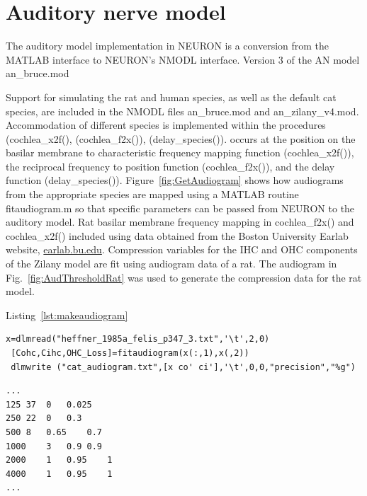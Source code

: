 \section{Auditory nerve model}

The auditory model implementation in NEURON is a conversion from the
MATLAB interface to NEURON's NMODL interface. Version 3 of the AN model \mbox{\textsf{an\_bruce.mod}}

Support for simulating the rat and human species, as well as the default cat species,  are included in the NMODL files
\mbox{\textsf{an\_bruce.mod}} and \mbox{\textsf{an\_zilany\_v4.mod}}.
Accommodation of different species is implemented within the procedures
(\mbox{\textsf{cochlea\_x2f()}}, (\mbox{\textsf{cochlea\_f2x()}}),
(\mbox{\textsf{delay\_species()}}). occurs at the position on the basilar
membrane to characteristic frequency mapping function
(\mbox{\textsf{cochlea\_x2f()}}), the reciprocal frequency to position function
(\mbox{\textsf{cochlea\_f2x()}}), and the delay function
(\mbox{\textsf{delay\_species()}}).  Figure~\ref{fig:GetAudiogram} shows how audiograms from the appropriate species are
mapped using a MATLAB routine \mbox{\textsf{fitaudiogram.m}} so that
specific parameters can be passed from NEURON to the auditory model.  Rat
basilar membrane frequency mapping in \mbox{\textsf{cochlea\_f2x()}} and
\mbox{\textsf{cochlea\_x2f()}} included using data obtained from the Boston
University Earlab website, \url{earlab.bu.edu}.  Compression variables for the
IHC and OHC components of the Zilany model are fit using audiogram data of a
rat.  The audiogram in Fig.~\ref{fig:AudThresholdRat} was used to generate the
compression data for the rat model.

\medskip{}

Listing~\ref{lst:makeaudiogram}
\begin{lstlisting}[label=lst:makeaudiogram,caption=Using  \mbox{\textsf{fitaudiogram.m}} to create COHC and CIHC vectors for the cat.]
 x=dlmread("heffner_1985a_felis_p347_3.txt",'\t',2,0)
 [Cohc,Cihc,OHC_Loss]=fitaudiogram(x(:,1),x(,2))
 dlmwrite ("cat_audiogram.txt",[x co' ci'],'\t',0,0,"precision","%g")
\end{lstlisting}


\begin{lstlisting}[label=lst:cataudiogram,caption=Portion of \mbox{\textsf{cat\_audiogram\.txt}}]
...
125	37	0	0.025
250	22	0	0.3
500	8	0.65	0.7
1000	3	0.9	0.9
2000	1	0.95	1
4000	1	0.95	1
...
\end{lstlisting}

